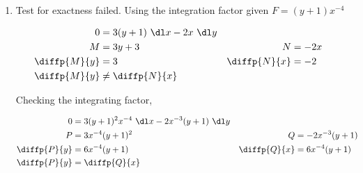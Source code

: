 \begin{enumerate}
          \begin{figure}[H]
              \centering
          \end{figure}

    \item Test for exactness failed. Using the integration factor given
          $ F = (y + 1)x^{-4} $

          \begin{align}
              0            & = 3(y + 1)\ \dl x - 2x\ \dl y                        \\
              M            & = 3y + 3                      & N            & = -2x \\
              \diffp{M}{y} & = 3                           & \diffp{N}{x} & = -2  \\
              \diffp{M}{y} & \neq \diffp{N}{x}
          \end{align}

          Checking the integrating factor,

          \begin{align}
              0            & = 3(y + 1)^{2}x^{-4}\ \dl x - 2x^{-3}(y+1)\ \dl y   \\
              P            & = 3x^{-4}(y+1)^{2}                                &
              Q            & = -2x^{-3}(y+1)                                     \\
              \diffp{P}{y} & = 6x^{-4}(y+1)                                    &
              \diffp{Q}{x} & = 6x^{-4}(y+1)                                      \\
              \diffp{P}{y} & = \diffp{Q}{x}
          \end{align}


\end{enumerate}
